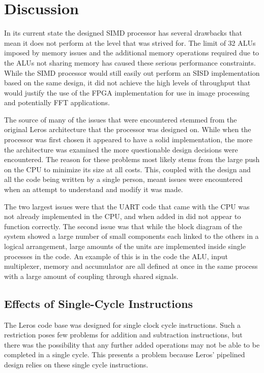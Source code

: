 \section{Discussion}
In its current state the designed SIMD processor has several drawbacks that mean
it does not perform at the level that was strived for. The limit of 32 ALUs
imposed by memory issues and the additional memory operations required due to
the ALUs not sharing memory has caused these serious performance constraints.
While the SIMD processor would still easily out perform an SISD implementation
based on the same design, it did not achieve the high levels of throughput that
would justify the use of the FPGA implementation for use in
image processing and potentially FFT applications.  

The source of many of the issues that were encountered stemmed from the original
Leros architecture that the processor was designed on. While when the processor
was first chosen it appeared to have a solid implementation, the more the
architecture was examined the more questionable design decisions were
encountered. The reason for these problems most likely stems from the
large push on the CPU to minimize its size at all costs. This, coupled with the
design and all the code being written by a single person, meant issues were
encountered when an attempt to understand and modify it was made.

The two
largest issues were that the UART code that came with the CPU was not
already implemented in the CPU, and when added in did not appear to function
correctly. The second issue was that while the block diagram of the system showed
a large number of small components each linked to the others in a logical
arrangement, large amounts of the units are implemented inside single
processes in the code. An example of this is in the code the ALU, input
multiplexer, memory and accumulator are all defined at once in the same process
with a large amount of coupling through shared signals.

\subsection{Effects of Single-Cycle Instructions}
The Leros code base was designed for single clock cycle instructions. Such a
restriction poses few problems for addition and subtraction instructions, but
there was the possibility that any further added operations may not be able to be
completed in a single cycle. This presents a problem because Leros' pipelined
design relies on these single cycle instructions.


